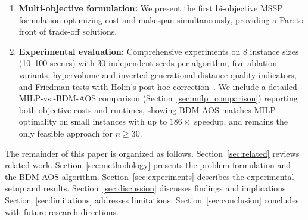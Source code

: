 \begin{enumerate}
    \item \textbf{Multi-objective formulation:} We present the first bi-objective MSSP formulation optimizing cost and makespan simultaneously, providing a Pareto front of trade-off solutions.

    \item \textbf{Experimental evaluation:} Comprehensive experiments on 8 instance sizes (10--100 scenes) with 30 independent seeds per algorithm, five ablation variants, hypervolume and inverted generational distance quality indicators, and Friedman tests with Holm's post-hoc correction~\citep{garcia2009, demsar2006, holm1979}.
    We include a detailed MILP-vs.-BDM-AOS comparison (Section~\ref{sec:milp_comparison}) reporting both objective costs and runtimes, showing BDM-AOS matches MILP optimality on small instances with up to $186\times$ speedup, and remains the only feasible approach for $n \geq 30$.
\end{enumerate}

The remainder of this paper is organized as follows.
Section~\ref{sec:related} reviews related work.
Section~\ref{sec:methodology} presents the problem formulation and the BDM-AOS algorithm.
Section~\ref{sec:experiments} describes the experimental setup and results.
Section~\ref{sec:discussion} discusses findings and implications.
Section~\ref{sec:limitations} addresses limitations.
Section~\ref{sec:conclusion} concludes with future research directions.
